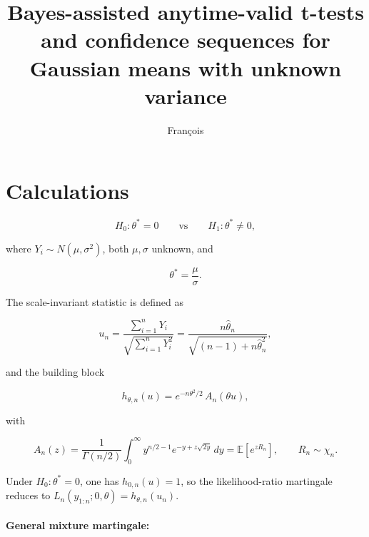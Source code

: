 \documentclass{article}%
\begin{document}
\title{Bayes-assisted anytime-valid t-tests and confidence sequences for Gaussian means with unknown variance}
\author{Fran\c{c}ois}
\maketitle

\section{Calculations}






\[
H_0:\theta^* = 0
\qquad\text{vs}\qquad
H_1:\theta^*\neq 0,
\]

where \(Y_i \sim N(\mu,\sigma^2)\), both \(\mu,\sigma\) unknown, and

\[
\theta^*=\frac{\mu}{\sigma}.
\]

The scale-invariant statistic is defined as

\[
u_n
=
\frac{\sum_{i=1}^n Y_i}{\sqrt{\sum_{i=1}^n Y_i^2}}
=
\frac{n\hat\theta_n}{\sqrt{(n-1)+n\hat\theta_n^2}},
\]

and the building block

\[
h_{\theta,n}(u)
=
e^{-n\theta^2/2}\,A_n(\theta u),
\]

with

\[
A_n(z)
=
\frac{1}{\Gamma(n/2)}
\int_0^\infty y^{n/2-1}e^{-y+z\sqrt{2y}}\,dy
=
\mathbb E[e^{zR_n}],
\qquad R_n\sim \chi_n.
\]

Under \(H_0:\theta^*=0\), one has \(h_{0,n}(u)=1\), so the likelihood-ratio martingale reduces to \(L_n(y_{1:n};0,\theta)=h_{\theta,n}(u_n)\).

\paragraph{General mixture martingale:}
\end{document}
